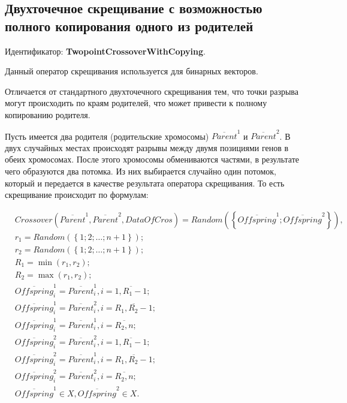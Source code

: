 \subsection{Двухточечное скрещивание с возможностью полного копирования одного из родителей}\label{SetOfOperatorsAlgorithms:TwopointCrossoverWithCopying}

Идентификатор: \textbf{TwopointCrossoverWithCopying}.

Данный оператор скрещивания используется для бинарных векторов.

Отличается от стандартного двухточечного скрещивания тем, что точки разрыва могут происходить по краям родителей, что может привести к полному копированию родителя.

Пусть имеется два родителя (родительские хромосомы) $\overline{Parent}^1$ и $\overline{Parent}^2$. В двух случайных местах происходят разрывы между двумя позициями генов в обеих хромосомах. После этого хромосомы обмениваются частями, в результате чего образуются два потомка. Из них выбирается случайно один потомок, который и передается в качестве результата оператора скрещивания. То есть скрещивание происходит по формулам:

\begin{align}
\label{SetOfOperatorsAlgorithms:eq:TwopointCrossoverWithCopying}
&Crossover \left( \overline{Parent}^1, \overline{Parent}^2, DataOfCros\right)=Random \left(\left\lbrace \overline{Offspring}^1; \overline{Offspring}^2\right\rbrace  \right), \\
&r_1=Random\left( \left\lbrace 1; 2; \ldots; n+1\right\rbrace \right); \nonumber \\
&r_2=Random\left( \left\lbrace 1; 2; \ldots; n+1\right\rbrace \right); \nonumber \\
&R_1=\min \left( r_1, r_2\right) ; \nonumber \\
&R_2=\max \left( r_1, r_2\right) ; \nonumber \\
& \overline{Offspring}^1_i=\overline{Parent}^1_i, i=\overline{1,R_1-1};\nonumber\\
& \overline{Offspring}^1_i=\overline{Parent}^2_i, i=\overline{R_1,R_2-1};\nonumber\\
&  \overline{Offspring}^1_i=\overline{Parent}^1_i, i=\overline{R_2,n};\nonumber\\
& \overline{Offspring}^2_i=\overline{Parent}^2_i, i=\overline{1,R_1-1};\nonumber\\
& \overline{Offspring}^2_i=\overline{Parent}^1_i, i=\overline{R_1,R_2-1};\nonumber\\
&  \overline{Offspring}^2_i=\overline{Parent}^2_i, i=\overline{R_2,n};\nonumber\\
&\overline{Offspring}^1\in X, \overline{Offspring}^2\in X.\nonumber
\end{align}

